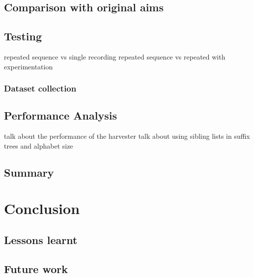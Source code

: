 \documentclass[12pt,twoside,notitlepage]{report}
\begin{document}
	\section{Comparison with original aims}
	\section{Testing}
		repeated sequence vs single recording
		repeated sequence vs repeated with experimentation
		\subsection{Dataset collection}
	\section{Performance Analysis}
	talk about the performance of the harvester
	talk about using sibling lists in suffix trees and alphabet size
	
	\section{Summary}
	
\cleardoublepage
\chapter{Conclusion}
	\section{Lessons learnt}
	\section{Future work}

\cleardoublepage

\end{document}
